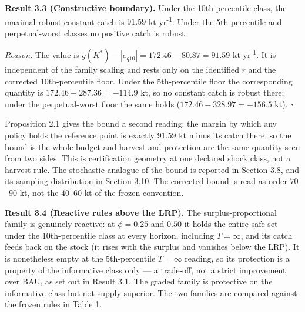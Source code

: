 \documentclass[11pt]{article}
\begin{document}
\textbf{Result 3.3 (Constructive boundary).} Under the 10th-percentile
class, the maximal robust constant catch is \(91.59\) kt yr\textsuperscript{-1}. Under the
5th-percentile and perpetual-worst classes no positive catch is robust.

\emph{Reason.} The value is
\(g(K^*) - |e_{q10}| = 172.46 - 80.87 = 91.59\) kt yr\textsuperscript{-1}. It is
independent of the family scaling and rests only on the identified \(r\)
and the corrected 10th-percentile floor. Under the 5th-percentile floor
the corresponding quantity is \(172.46 - 287.36 = -114.9\) kt, so no
constant catch is robust there; under the perpetual-worst floor the same
holds (\(172.46 - 328.97 = -156.5\) kt). \ensuremath{\square}

Proposition 2.1 gives the bound a second reading: the margin by which
any policy holds the reference point is exactly \(91.59\) kt minus its
catch there, so the bound is the whole budget and harvest and protection
are the same quantity seen from two sides. This is certification
geometry at one declared shock class, not a harvest rule. The stochastic analogue of the bound is reported in
Section 3.8, and its sampling distribution in Section 3.10. The
corrected bound is read as order \(70\)--\(90\) kt, not the
\(40\)--\(60\) kt of the frozen convention.

\textbf{Result 3.4 (Reactive rules above the LRP).} The
surplus-proportional family is genuinely reactive: at \(\phi = 0.25\)
and \(0.50\) it holds the entire safe set under the 10th-percentile
class at every horizon, including \(T = \infty\), and its catch feeds
back on the stock (it rises with the surplus and vanishes below the
LRP). It is nonetheless empty at the 5th-percentile \(T=\infty\)
reading, so its protection is a property of the informative class only
--- a trade-off, not a strict improvement over BAU, as set out in Result
3.1. The graded family is protective on the informative class but not
supply-superior. The two families are compared against the frozen rules
in Table 1.
\end{document}
